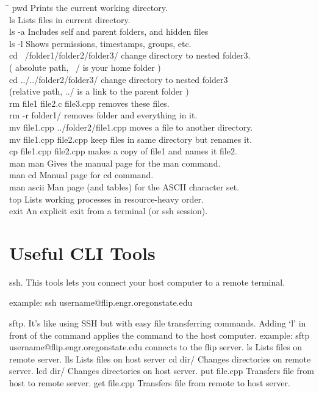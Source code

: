 \documentclass[letterpaper,10pt,titlepage,fleqn]{article}
\begin{document}
\begin{tabbing}
\hspace*{2cm}\=\hspace*{3cm}\= \kill
pwd									\>\>Prints the current working directory.\\
ls									\>\>Lists files in current directory.\\
ls -a								\>\>Includes self and parent folders, and hidden files\\
ls -l								\>\>Shows permissions, timestamps, groups, etc.\\
cd ~/folder1/folder2/folder3/		\>\>change directory to nested folder3.\\
									\>\>( absolute path, ~/ is your home folder )\\
cd ../../folder2/folder3/			\>\>change directory to nested folder3\\
									\>\>(relative path, ../ is a link to the parent folder )\\
rm file1 file2.c file3.cpp			\>\>removes these files.\\
rm -r folder1/						\>\>removes folder and everything in it.\\
mv file1.cpp ../folder2/file1.cpp	\>\>moves a file to another directory.\\
mv file1.cpp file2.cpp				\>\>keep files in same directory but renames it.\\
cp file1.cpp file2.cpp				\>\>makes a copy of file1 and names it file2.\\
man man								\>\>Gives the manual page for the man command.\\
man cd								\>\>Manual page for cd command.\\
man ascii							\>\>Man page (and tables) for the ASCII character set.\\
top									\>\>Lists working processes in resource-heavy order.\\
exit								\>\>An explicit exit from a terminal (or ssh
session). \\
\end{tabbing}



\section{Useful CLI Tools}
ssh. This tools lets you connect your host computer to a remote terminal.

example:
ssh username@flip.engr.oregonstate.edu

sftp. It’s like using SSH but with easy file transferring commands. Adding ‘l’ in front of the command applies the command to the host computer. 
example:
sftp username@flip.engr.oregonstate.edu    connects to the flip server.
ls                        Lists files on remote server.
lls                        Lists files on host server
cd dir/                        Changes directories on remote server.
lcd dir/                        Changes directories on host server.
put file.cpp                    Transfers file from host to remote server.
get file.cpp                    Transfers file from remote to host server.
    
\end{document}
